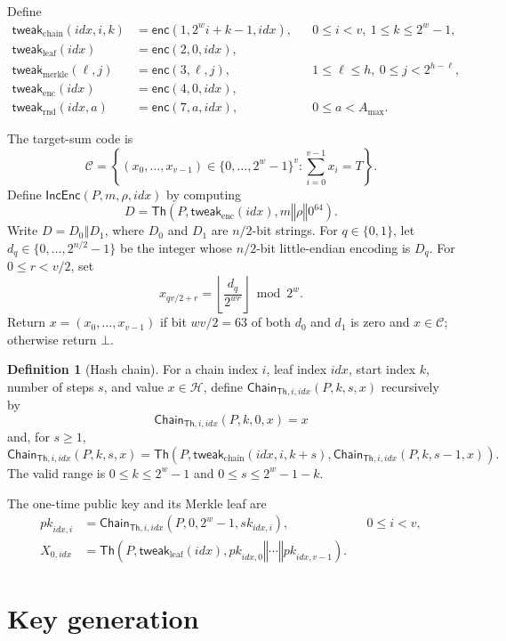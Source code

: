 \documentclass[11pt]{article}
\theoremstyle{definition}
\newtheorem{definition}{Definition}[section]
\theoremstyle{plain}
\theoremstyle{remark}
\newcommand{\Th}{\mathsf{Th}}
\newcommand{\IncEnc}{\mathsf{IncEnc}}
\newcommand{\Chain}{\mathsf{Chain}}
\newcommand{\concat}{\mathbin\Vert}
\newcommand{\idx}{\mathit{idx}}
\newcommand{\amax}{A_{\max}}
\begin{document}
Define
\[
\begin{aligned}
  \mathsf{tweak}_{\mathrm{chain}}(\idx,i,k) &= \mathsf{enc}(1,2^wi+k-1,\idx), &&0\leq i<v,\ 1\leq k\leq2^w-1,\\
  \mathsf{tweak}_{\mathrm{leaf}}(\idx) &= \mathsf{enc}(2,0,\idx),\\
  \mathsf{tweak}_{\mathrm{merkle}}(\ell,j) &= \mathsf{enc}(3,\ell,j), &&1\leq\ell\leq h,\ 0\leq j<2^{h-\ell},\\
  \mathsf{tweak}_{\mathrm{enc}}(\idx) &= \mathsf{enc}(4,0,\idx),\\
  \mathsf{tweak}_{\mathrm{rnd}}(\idx,a) &= \mathsf{enc}(7,a,\idx), &&0\leq a<\amax.
\end{aligned}
\]

The target-sum code is~\cite{DKKW25}
\[
  \mathcal C=\left\{(x_0,\ldots,x_{v-1})\in\{0,\ldots,2^w - 1\}^{v}:\sum_{i=0}^{v-1}x_i=T\right\}.
\]
Define $\IncEnc(P,m,\rho,\idx)$ by computing
\[
  D=\Th\!\left(P,\mathsf{tweak}_{\mathrm{enc}}(\idx),m\concat\rho\concat 0^{64}\right).
\]
Write $D=D_0\concat D_1$, where $D_0$ and $D_1$ are $n/2$-bit strings. For $q\in\{0,1\}$, let $d_q\in\{0,\ldots,2^{n/2}-1\}$ be the integer whose $n/2$-bit little-endian encoding is $D_q$. For $0\leq r<v/2$, set
\[
  x_{qv/2+r}=\left\lfloor\frac{d_q}{2^{wr}}\right\rfloor\bmod 2^w.
\]
Return $x=(x_0,\ldots,x_{v-1})$ if bit $wv/2=63$ of both $d_0$ and $d_1$ is zero and $x\in\mathcal C$; otherwise return $\bot$.

\begin{definition}[Hash chain]
For a chain index $i$, leaf index $\idx$, start index $k$, number of steps $s$, and value $x\in\mathcal H$, define $\Chain_{\Th,i,\idx}(P,k,s,x)$ recursively by
\[
  \Chain_{\Th,i,\idx}(P,k,0,x)=x
\]
and, for $s\geq1$,
\[
  \Chain_{\Th,i,\idx}(P,k,s,x)=\Th\!\left(P,\mathsf{tweak}_{\mathrm{chain}}(\idx,i,k+s),\Chain_{\Th,i,\idx}(P,k,s-1,x)\right).
\]
The valid range is $0\leq k\leq2^w-1$ and $0\leq s\leq2^w-1-k$.
\end{definition}

The one-time public key and its Merkle leaf are
\[
\begin{aligned}
  \mathit{pk}_{\idx,i} &= \Chain_{\Th,i,\idx}(P,0,2^w-1,\mathit{sk}_{\idx,i}), &&0\leq i<v,\\
  X_{0,\idx} &= \Th\!\left(P,\mathsf{tweak}_{\mathrm{leaf}}(\idx),\mathit{pk}_{\idx,0}\concat\cdots\concat\mathit{pk}_{\idx,v-1}\right).
\end{aligned}
\]

\section{Key generation}
\end{document}
